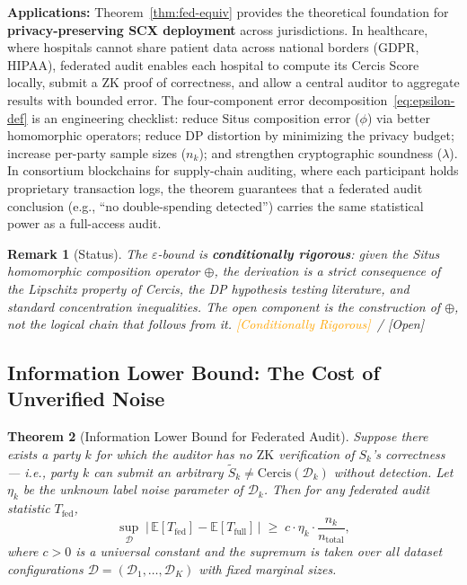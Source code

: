 \documentclass[12pt,a4paper]{article}
\newtheorem{theorem}{Theorem}[section]
\newtheorem{remark}[theorem]{Remark}
\newcommand{\conditionallyrigorous}{\textcolor{orange}{\small\textsf{[Conditionally Rigorous]}}}
\newcommand{\openquest}{\textcolor{red!70!black}{\small\textsf{[Open]}}}
\newcommand{\E}{\mathbb{E}}
\newcommand{\cD}{\mathcal{D}}
\newcommand{\Cercis}{\mathrm{Cercis}}
\newcommand{\ZK}{\mathrm{ZK}}
\begin{document}
\medskip\noindent
\textbf{Applications:}
Theorem~\ref{thm:fed-equiv} provides the theoretical foundation for
\textbf{privacy-preserving SCX deployment} across jurisdictions.  In
healthcare, where hospitals cannot share patient data across national borders
(GDPR, HIPAA), federated audit enables each hospital to compute its Cercis
Score locally, submit a ZK proof of correctness, and allow a central auditor
to aggregate results with bounded error.  The four-component error
decomposition~\eqref{eq:epsilon-def} is an engineering checklist: reduce Situs
composition error ($\phi$) via better homomorphic operators; reduce DP
distortion by minimizing the privacy budget; increase per-party sample sizes
($n_k$); and strengthen cryptographic soundness ($\lambda$).  In consortium
blockchains for supply-chain auditing, where each participant holds
proprietary transaction logs, the theorem guarantees that a federated audit
conclusion (e.g., ``no double-spending detected'') carries the same
statistical power as a full-access audit.

\begin{remark}[Status]
The $\varepsilon$-bound is \textbf{conditionally rigorous}: given the Situs
homomorphic composition operator $\oplus$, the derivation is a strict
consequence of the Lipschitz property of Cercis, the DP hypothesis testing
literature, and standard concentration inequalities.  The open component is
the \emph{construction} of $\oplus$, not the logical chain that follows
from it.  \conditionallyrigorous~/ \openquest
\end{remark}

\subsection{Information Lower Bound: The Cost of Unverified Noise}

\begin{theorem}[Information Lower Bound for Federated Audit]
\label{thm:info-lower}
Suppose there exists a party $k$ for which the auditor has \emph{no}
$\ZK$ verification of $S_k$'s correctness — i.e., party $k$ can submit
an arbitrary $\tilde{S}_k \neq \Cercis(\cD_k)$ without detection.  Let
$\eta_k$ be the unknown label noise parameter of $\cD_k$.  Then for any
federated audit statistic $T_{\mathrm{fed}}$,
\begin{equation}\label{eq:lower-bound}
    \sup_{\cD}\;
    \big|\,\E[T_{\mathrm{fed}}] - \E[T_{\mathrm{full}}]\,\big|
    \;\geq\; c \cdot \eta_k \cdot \frac{n_k}{n_{\mathrm{total}}},
\end{equation}
where $c > 0$ is a universal constant and the supremum is taken over all
dataset configurations $\cD = (\cD_1, \dots, \cD_K)$ with fixed marginal
sizes.
\end{theorem}
\end{document}
